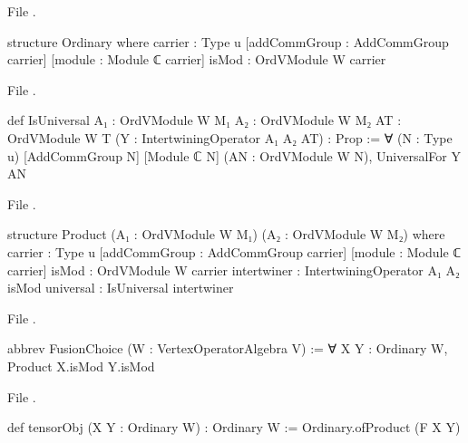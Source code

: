 \noindent File .
\begin{leancode}
structure Ordinary where
  carrier : Type u
  [addCommGroup : AddCommGroup carrier]
  [module : Module ℂ carrier]
  isMod : OrdVModule W carrier
\end{leancode}
\noindent File .
\begin{leancode}
def IsUniversal {A₁ : OrdVModule W M₁} {A₂ : OrdVModule W M₂}
    {AT : OrdVModule W T} (Y : IntertwiningOperator A₁ A₂ AT) : Prop :=
  ∀ (N : Type u) [AddCommGroup N] [Module ℂ N] (AN : OrdVModule W N), UniversalFor Y AN
\end{leancode}
\noindent File .
\begin{leancode}
structure Product (A₁ : OrdVModule W M₁) (A₂ : OrdVModule W M₂) where
  carrier : Type u
  [addCommGroup : AddCommGroup carrier]
  [module : Module ℂ carrier]
  isMod : OrdVModule W carrier
  intertwiner : IntertwiningOperator A₁ A₂ isMod
  universal : IsUniversal intertwiner
\end{leancode}
\noindent File .
\begin{leancode}
abbrev FusionChoice (W : VertexOperatorAlgebra V) :=
  ∀ X Y : Ordinary W, Product X.isMod Y.isMod
\end{leancode}
\noindent File .
\begin{leancode}
def tensorObj (X Y : Ordinary W) : Ordinary W := Ordinary.ofProduct (F X Y)
\end{leancode}

